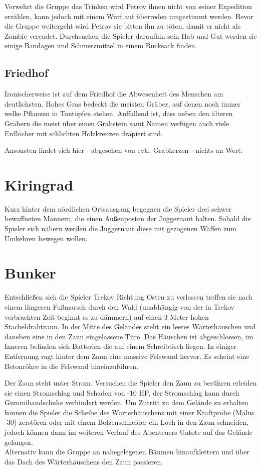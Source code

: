 \documentclass{include/protokollclass}
\begin{document}
Verwehrt die Gruppe das Trinken wird Petrov ihnen nicht von seiner Expedition erzählen, kann jedoch mit einem Wurf auf überreden umgestimmt werden. Bevor die Gruppe weitergeht wird Petrov sie bitten ihn zu töten, damit er nicht als Zombie verendet.
Durchsuchen die Spieler daraufhin sein Hab und Gut werden sie einige Bandagen und Schmerzmittel in einem Rucksack finden.

\subsection{Friedhof}
Ironischerweise ist auf dem Friedhof die Abwesenheit des Menschen am deutlichsten. Hohes Gras bedeckt die meisten Gräber, auf denen noch immer welke Pflanzen in Tontöpfen stehen. Auffallend ist, dass neben den älteren Gräbern die meist über einen Grabstein samt Namen verfügen auch viele Erdlöcher mit schlichten Holzkreuzen drapiert sind.

Ansonsten findet sich hier - abgesehen von evtl. Grabkerzen - nichts an Wert.

\section{Kiringrad}

Kurz hinter dem nördlichen Ortsausgang begegnen die Spieler drei schwer bewaffneten Männern, die einen Außenposten der Juggernaut halten.
Sobald die Spieler sich nähern werden die Juggernaut diese mit gezogenen Waffen zum Umkehren bewegen wollen.

\section{Bunker}

Entschließen sich die Spieler Trekov Richtung Osten zu verlassen treffen sie nach einem längeren Fußmarsch durch den Wald (unabhängig von der in Trekov verbrachten Zeit beginnt es zu dämmern) auf einen 3 Meter hohen Stacheldrahtzaun.
In der Mitte des Geländes steht ein leeres Wärterhäuschen und daneben eine in den Zaun eingelassene Türe. Das Häuschen ist abgeschlossen, im Inneren befinden sich Batterien die auf einem Schreibtisch liegen.
In einiger Entfernung ragt hinter dem Zaun eine massive Felswand hervor. Es scheint eine Betonröhre in die Felswand hineinzuführen.

Der Zaun steht unter Strom. Versuchen die Spieler den Zaun zu berühren erleiden sie einen Stromschlag und Schaden von -10 HP, der Stromschlag kann durch Gummihandschuhe verhindert werden.
Um Zutritt zu dem Gelände zu erhalten können die Spieler die Scheibe des Wärterhäuschens mit einer Kraftprobe (Malus -30) zerstören oder mit einem Bolzenschneider ein Loch in den Zaun schneiden, jedoch können dann im weiteren Verlauf des Abenteuers Untote auf das Gelände gelangen.
\\Alternativ kann die Gruppe an nahegelegenen Bäumen hinaufklettern und über das Dach des Wärterhäuschens den Zaun passieren.
\end{document}

